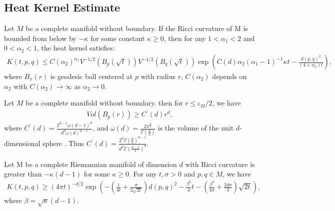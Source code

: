 \subsection{Heat Kernel Estimate}
\begin{theorem} \cite[Cor. 3.1]{yauupbound} 
	\label{thm:upper_app}
	Let $M$ be a complete manifold without boundary. If the Ricci curvature of M is bounded from below by $-\kappa$ for some constant $\kappa\geq 0$, then for any $1<\alpha_1<2$ and $0<\alpha_2<1$, the heat kernel satisfies:
	\begin{align}
		K(t,p,q) \leq C(\alpha_2)^{\alpha_1} V^{-1/2}(B_p(\sqrt{t}))V^{-1/2}(B_q(\sqrt{t})) \exp \left(C(d)\alpha_2(\alpha_1-1)^{-1}\kappa t-\frac{d(p,q)^2}{(4+\alpha_2)t}\right),
	\end{align}
	where $B_x(r)$ is geodesic ball centered at $p$ with radius $r$, $C(\alpha_2)$ depends on $\alpha_2$ with $C(\alpha_2) \rightarrow \infty$ as $\alpha_2\rightarrow 0$.
\end{theorem}






\begin{lemma} \cite[Prop. 14]{croke1980some}
	\label{injvol}
	Let $M$ be a complete manifold without boundary. then for $r \leq \iota_M /2$, we have 
	\begin{align}
		Vol(B_p(r)) \geq C^\prime(d) r^d,
	\end{align}
	where $C^\prime(d) = \frac{2^{d-1} \omega(d-1)^d}{d^d \omega (d)^{d-1}}$, and
	$\omega(d)=\frac{2\pi^{\frac{d}{2}}}{\Gamma(\frac{d}{2})}$ is the volume of the unit $d$-dimensional sphere . Thus $C^\prime(d)= \frac{2^d \Gamma(\frac{d}{2})^{d-1}}{d^d \Gamma(\frac{d-1}{2})^d}$.
\end{lemma}




\begin{theorem}\cite[Thm. 3.1]{wang1997sharp}
	\label{thm:lower_app}
	Let M be a complete Riemannian manifold of dimension $d$ with Ricci curvature is greater than $-\kappa(d-1)$ for some $\kappa\geq 0$. For any $t, \sigma>0$ and $p,q\in M$, we have
	\begin{align}
		K(t,p,q) \geq (4\pi t)^{-d/2} \exp \left(-\left(\frac{1}{4t}+\frac{\sigma}{3\sqrt{2t}}\right)d(p,q)^2-\frac{\beta^2 }{4}t-(\frac{\beta^2}{4\sigma}+\frac{2d\sigma}{3})\sqrt{2t}\right),
	\end{align}
	where $\beta=\sqrt{\kappa}(d-1)$.
\end{theorem}



